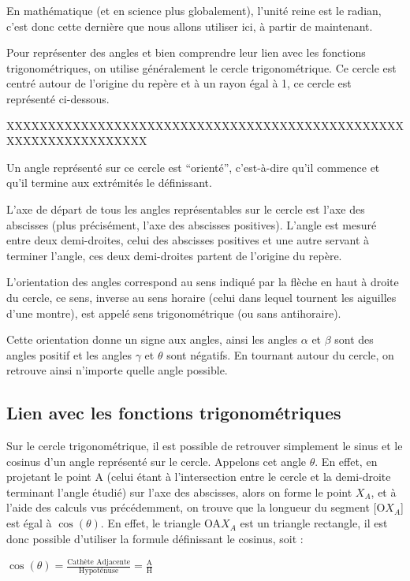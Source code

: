 \documentclass[a4paper]{article}
\begin{document}
			En mathématique (et en science plus globalement), l'unité reine est le radian, c'est donc cette dernière que nous allons utiliser ici, à partir de maintenant.

			Pour représenter des angles et bien comprendre leur lien avec les fonctions trigonométriques, on utilise généralement le cercle trigonométrique. Ce cercle est centré autour de l'origine du repère et à un rayon égal à 1, ce cercle est représenté ci-dessous. 

			XXXXXXXXXXXXXXXXXXXXXXXXXXXXXXXXXXXXXXXXXXXXXXXXXXXXXXXXXXXXXXXXX

			Un angle représenté sur ce cercle est “orienté”, c'est-à-dire qu'il commence et qu'il termine aux extrémités le définissant.

			L'axe de départ de tous les angles représentables sur le cercle est l'axe des abscisses (plus précisément, l'axe des abscisses positives). L'angle est mesuré entre deux demi-droites, celui des abscisses positives et une autre servant à terminer l'angle, ces deux demi-droites partent de l'origine du repère.

			L'orientation des angles correspond au sens indiqué par la flèche en haut à droite du cercle, ce sens, inverse au sens horaire (celui dans lequel tournent les aiguilles d'une montre), est appelé sens trigonométrique (ou sans antihoraire).

			Cette orientation donne un signe aux angles, ainsi les angles $\alpha$ et $\beta$ sont des angles positif et les angles $\gamma$ et $\theta$ sont négatifs. En tournant autour du cercle, on retrouve ainsi n'importe quelle angle possible. 

		\subsection{Lien avec les fonctions trigonométriques}

			Sur le cercle trigonométrique, il est possible de retrouver simplement le sinus et le cosinus d'un angle représenté sur le cercle. Appelons cet angle $\theta$. En effet, en projetant le point A (celui étant à l'intersection entre le cercle et la demi-droite terminant l'angle étudié) sur l'axe des abscisses, alors on forme le point $X_A$, et à l'aide des calculs vus précédemment, on trouve que la longueur du segment [O$X_A$] est égal à $\cos(\theta)$. En effet, le triangle OA$X_A$ est un triangle rectangle, il est donc possible d'utiliser la formule définissant le cosinus, soit :

			$\cos(\theta) = \frac{\text{Cathète Adjacente}}{\text{Hypoténuse}} = \frac{\text{A}}{\text{H}}$
\end{document}
